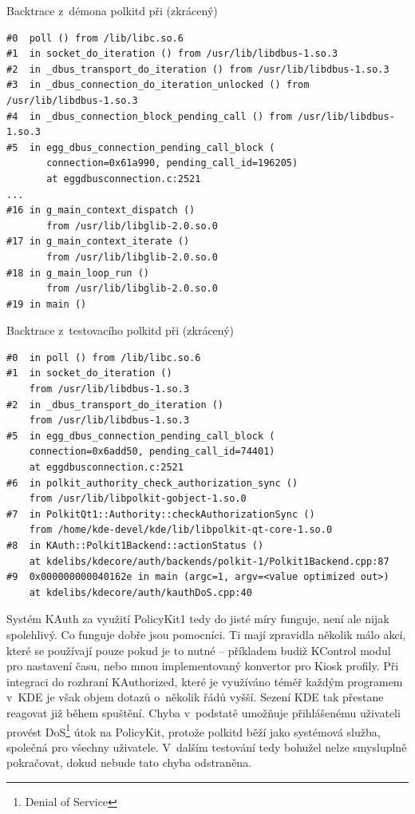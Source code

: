\begin{mylisting}
\caption{Backtrace z~démona polkitd při  (zkrácený)}
\label{btrac1}
\begin{lstlisting}
#0  poll () from /lib/libc.so.6
#1  in socket_do_iteration () from /usr/lib/libdbus-1.so.3
#2  in _dbus_transport_do_iteration () from /usr/lib/libdbus-1.so.3
#3  in _dbus_connection_do_iteration_unlocked () from /usr/lib/libdbus-1.so.3
#4  in _dbus_connection_block_pending_call () from /usr/lib/libdbus-1.so.3
#5  in egg_dbus_connection_pending_call_block (
       connection=0x61a990, pending_call_id=196205)
       at eggdbusconnection.c:2521
...      
#16 in g_main_context_dispatch ()
       from /usr/lib/libglib-2.0.so.0
#17 in g_main_context_iterate ()
       from /usr/lib/libglib-2.0.so.0
#18 in g_main_loop_run ()
       from /usr/lib/libglib-2.0.so.0
#19 in main ()
\end{lstlisting}
\end{mylisting}

\begin{mylisting}
\caption{Backtrace z~testovacího polkitd při  (zkrácený)}
\label{btrac2}
\begin{lstlisting}
#0  in poll () from /lib/libc.so.6
#1  in socket_do_iteration ()
    from /usr/lib/libdbus-1.so.3
#2  in _dbus_transport_do_iteration ()
    from /usr/lib/libdbus-1.so.3
#5  in egg_dbus_connection_pending_call_block (
    connection=0x6add50, pending_call_id=74401)
    at eggdbusconnection.c:2521
#6  in polkit_authority_check_authorization_sync ()
    from /usr/lib/libpolkit-gobject-1.so.0
#7  in PolkitQt1::Authority::checkAuthorizationSync ()
    from /home/kde-devel/kde/lib/libpolkit-qt-core-1.so.0
#8  in KAuth::Polkit1Backend::actionStatus ()
    at kdelibs/kdecore/auth/backends/polkit-1/Polkit1Backend.cpp:87
#9  0x000000000040162e in main (argc=1, argv=<value optimized out>)
    at kdelibs/kdecore/auth/kauthDoS.cpp:40 
\end{lstlisting}
\end{mylisting}
Systém KAuth za využití PolicyKit1 tedy do jisté míry funguje, není ale nijak spolehlivý. Co funguje dobře jsou pomocníci. Ti mají zpravidla několik málo akcí, které se používají pouze pokud je to nutné -- příkladem budiž KControl modul pro nastavení času, nebo mnou implementovaný konvertor pro Kiosk profily. Při integraci do rozhraní KAuthorized, které je využíváno téměř každým programem v~KDE je však objem dotazů o~několik řádů vyšší. Sezení KDE tak přestane reagovat již během spuštění. Chyba v~podstatě umožňuje přihlášenému uživateli provést DoS\footnote{Denial of Service} útok na PolicyKit, protože polkitd běží jako systémová služba, společná pro všechny uživatele. V~dalším testování tedy bohužel nelze smysluplně pokračovat, dokud nebude tato chyba odstraněna.

